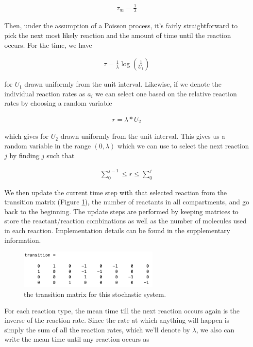 \documentclass[fleqn,10pt]{wlscirep}
\begin{document}
    \begin{align*}
        \tau_m = \frac{1}{\lambda}    
    \end{align*}
    
Then, under the assumption of a Poisson process, it's fairly straightforward to pick the next most likely reaction and the amount of time until the reaction occurs. For the time, we have
    
    \begin{align*}
        \tau = \frac{1}{\lambda}\log(\frac{1}{U_1})
    \end{align*}
    
for $U_1$ drawn uniformly from the unit interval.  Likewise, if we denote the individual reaction rates as $a_i$ we can select one based on the relative reaction rates by choosing a random variable
    
    \begin{align*}
        r = \lambda*U_2
    \end{align*}
    
which gives for $U_2$ drawn uniformly from the unit interval. This gives us a random variable in the range $(0, \lambda)$  which we can use to select the next reaction $j$ by finding $j$ such that
    
    \begin{align*}
        \sum\limits_0^{j-1} \leq r \leq \sum\limits_0^j
    \end{align*}
    
We then update the current time step with that selected reaction from the transition matrix (Figure \ref{fig:transition}), the number of reactants in all compartments, and go back to the beginning. The update steps are performed by keeping matrices to store the reactant/reaction combinations as well as the number of molecules used in each reaction.  Implementation details can be found in the supplementary information.

 \begin{figure}[ht]
\centering
\includegraphics[width=7cm]{transition}
\caption{the transition matrix for this stochastic system.}
\label{fig:transition} 
\end{figure}

For each reaction type, the mean time till the next reaction occurs again is the inverse of the reaction rate.  Since the rate at which anything will happen is simply the sum of all the reaction rates, which we'll denote by $\lambda$, we also can write the mean time until any reaction occurs as   
\end{document}
